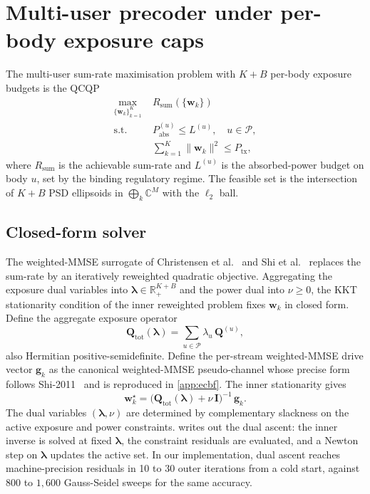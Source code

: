 \documentclass[journal,twocolumn,10pt]{IEEEtran}
\theoremstyle{plain}
\theoremstyle{remark}
\newcommand{\ww}{\mathbf{w}}
\newcommand{\gvec}{\mathbf{g}}
\newcommand{\Pabs}{P_{\mathrm{abs}}}
\newcommand{\Qmat}{\mathbf{Q}}
\newcommand{\Complex}{\mathbb{C}}
\newcommand{\AllBodies}{\mathcal{P}}
\begin{document}
\section{Multi-user precoder under per-body exposure caps}\label{sec:precoder}

The multi-user sum-rate maximisation problem with $K + B$ per-body
exposure budgets is the QCQP
\begin{equation}\label{eq:P-MB}
\begin{aligned}
  \max_{\{\ww_k\}_{k=1}^K} \;& R_{\mathrm{sum}}(\{\ww_k\}) \\
  \text{s.t.}\;& \Pabs^{(u)} \leq L^{(u)},\quad u \in \AllBodies,\\
  & \sum_{k=1}^K \|\ww_k\|^2 \leq P_{\mathrm{tx}},
\end{aligned}
\end{equation}
where $R_{\mathrm{sum}}$ is the achievable sum-rate and $L^{(u)}$ is
the absorbed-power budget on body $u$, set by the binding regulatory
regime. The feasible set is the intersection of $K + B$ PSD ellipsoids
in $\bigoplus_k \Complex^M$ with the $\ell_2$ ball.

\subsection{Closed-form solver}

The weighted-MMSE surrogate of Christensen et
al.~\cite{Christensen2008} and Shi et al.~\cite{Shi2011} replaces the
sum-rate by an iteratively reweighted quadratic objective. Aggregating
the exposure dual variables into $\bm\lambda \in \mathbb{R}_+^{K+B}$
and the power dual into $\nu \geq 0$, the KKT stationarity condition
of the inner reweighted problem fixes $\ww_k$ in closed form. Define
the aggregate exposure operator
\begin{equation}\label{eq:Qtot}
  \Qmat_{\mathrm{tot}}(\bm\lambda) =
  \sum_{u \in \AllBodies} \lambda_u\,\Qmat^{(u)},
\end{equation}
also Hermitian positive-semidefinite. Define the per-stream
weighted-MMSE drive vector $\gvec_k$ as the canonical
weighted-MMSE pseudo-channel whose precise form follows
Shi-2011~\cite{Shi2011} and is reproduced in \cref{app:ecbf}. The
inner stationarity gives
\begin{equation}\label{eq:closedform}
  \boxed{\;
  \ww_k^\star =
  \bigl(\Qmat_{\mathrm{tot}}(\bm\lambda) + \nu\,\mathbf{I}\bigr)^{-1}\,
  \gvec_k.\;}
\end{equation}
The dual variables $(\bm\lambda, \nu)$ are determined by
complementary slackness on the active exposure and power constraints.
 writes out the dual ascent: the inner inverse is
solved at fixed $\bm\lambda$, the constraint residuals are evaluated,
and a Newton step on $\bm\lambda$ updates the active set. In our
implementation, dual ascent reaches machine-precision residuals in
10 to 30 outer iterations from a cold start, against 800 to
$1{,}600$ Gauss-Seidel sweeps for the same accuracy.
\end{document}

